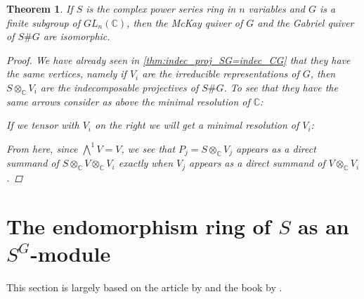 \documentclass[11pt, a4paper, english]{article}
\numberwithin{prop}{section}
\numberwithin{lemma}{section}
\newtheorem{theorem}{Theorem}
\numberwithin{theorem}{section}
\numberwithin{defin}{section}
\numberwithin{example}{section}
\newcommand{\C}{\mathbb{C}}
\begin{document}
\begin{theorem}
If $S$ is the complex power series ring in $n$ variables and $G$ is a finite subgroup of $GL_n(\C)$, then the McKay quiver of $G$ and the Gabriel quiver of $S\#G$ are isomorphic.
\begin{proof}
We have already seen in \cref{thm:indec_proj_SG=indec_CG} that they have the same vertices, namely if $V_i$ are the irreducible representations of $G$, then $S \otimes_\C V_i$ are the indecomposable projectives of $S\#G$. To see that they have the same arrows consider as above the minimal resolution of $\C$:
\begin{center}
\end{center}
If we tensor with $V_i$ on the right we will get a minimal resolution of $V_i$:
\begin{center}
\end{center}
From here, since $\bigwedge\limits^{1} V = V$, we see that $P_j = S \otimes_\C V_j$ appears as a direct summand of $S \otimes_\C V \otimes_\C V_i$ exactly when $V_j$ appears as a direct summand of $V \otimes_\C V_i$.
\end{proof}
\end{theorem}

\section{The endomorphism ring of $S$ as an $S^G$-module}
This section is largely based on the article by \cite{IyTa} and the book by \cite{CMR}.
\end{document}
